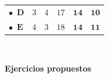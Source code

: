 \documentclass[10pt, a4paper]{article}
\begin{document}
\begin{minipage}{\linewidth}
\begin{minipage}[t]{0.275\linewidth}
\begin{tabular}{lccccc}
\textcolor{col3}{$\bullet$}\ \textcolor{col3}{$\mathbf{D}$} & $3$ & $4$ & $17$ & \textcolor{tr}{$\boldsymbol{14}$} & \textcolor{es}{$\boldsymbol{10}$} \\
\textcolor{col4}{$\bullet$}\ \textcolor{col4}{$\mathbf{E}$} & $4$ & $3$ & $18$ & \textcolor{tr}{$\boldsymbol{14}$} & \textcolor{es}{$\boldsymbol{11}$} \\
\bottomrule\end{tabular}\\[5pt]
\hspace{2mm}
\end{minipage}
\end{minipage}
\par\vspace{0.35cm}
\newpage
{\Large\textbf{Ejercicios propuestos}}\par\vspace{6pt}
\end{document}
